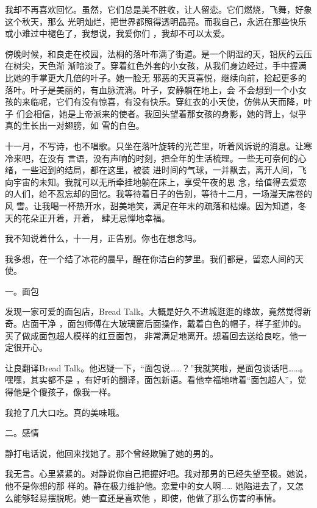 \documentclass[12pt,a4paper]{article}
\newcommand{\subpart}[1]{
	\begingroup \par
	\vspace{1ex} \centering #1
	\par \endgroup
}
\begin{document}
		我却不再喜欢回忆。虽然，它们总是美不胜收，让人留恋。它们燃烧，飞舞，好象这个秋天，那么
	光明灿烂，把世界都照得透明晶亮。而我自己，永远在那些快乐或小难过中褪色了，我想说，我爱你们
	，我却不可以太爱。


		傍晚时候，和良走在校园，法桐的落叶布满了街道。是一个阴湿的天，铅灰的云压在树尖，天色渐
	渐暗淡了。穿着红色外套的小女孩，从我们身边经过，手中握满比她的手掌更大几倍的叶子。她一脸无
	邪恶的天真喜悦，继续向前，拾起更多的落叶。叶子是美丽的，有血脉流淌。叶子，安静躺在地上，会
	不会想到一个小女孩的来临呢，它们有没有惊喜，有没有快乐。穿红衣的小天使，仿佛从天而降，叶子
	们会相信，她是上帝派来的使者。我回头望着那女孩的身影，她的背上，似乎真的生长出一对翅膀，如
	雪的白色。


		十一月，不写诗，也不唱歌。只坐在落叶旋转的光芒里，听着风诉说的消息。让寒冷来吧，在没有
	言语，没有声响的时刻，把全年的生活梳理。一些无可奈何的心绪，一些迟到的结局，都在这里，被装
	进时间的气球，一并飘去，离开人间，飞向宇宙的未知。我就可以无所牵挂地躺在床上，享受午夜的思
	念，给值得去爱恋的人们，给不忍忘却的回忆。我等待着日子的告别，等待十二月，一场漫天席卷的风
	雪。让我喝一杯热开水，甜美地笑，满足在年末的疏落和枯燥。因为知道，冬天的花朵正开着，开着，
	肆无忌惮地幸福。


		我不知说着什么，十一月，正告别。你也在想念吗。

		我多想，在一个结了冰花的晨早，醒在你洁白的梦里。我们都是，留恋人间的天使。

	\endwriting



		\subpart{一。面包}

		发现一家可爱的面包店，Bread Talk。大概是好久不进城逛逛的缘故，竟然觉得新奇。店面干净
	，面包师傅在大玻璃窗后面操作，戴着白色的帽子，样子挺帅的。买了做成面包超人模样的红豆面包，
	非常满足地离开。想着回去送给良吃，他一定很开心。

		让良翻译Bread Talk。他迟疑一下，“面包说……？”我就笑啦，是面包谈话吧……。嘿嘿，其实都不是
	，有好听的翻译，面包新语。看他幸福地啃着“面包超人”，觉得他是个傻孩子，像我一样。

		我抢了几大口吃。真的美味哦。

		\subpart{二。感情}

		静打电话说，他回来找她了。那个曾经欺骗了她的男的。

		我无言。心里紧紧的。对静说你自己把握好吧。我对那男的已经失望至极。她说，他不是你想的那
	样的。静在极力维护他。恋爱中的女人啊…… 她陷进去了，又怎么能够轻易摆脱呢。她一直还是喜欢他
	，即使，他做了那么伤害的事情。
\end{document}
